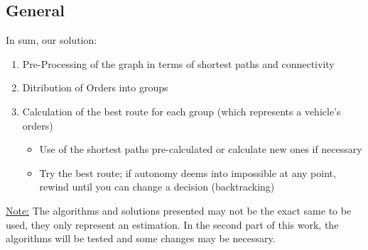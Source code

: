 \subsection{General}
In sum, our solution:
\begin{enumerate}
    \item Pre-Processing of the graph in terms of shortest paths and connectivity
    \item Ditribution of Orders into groups
    \item Calculation of the best route for each group (which represents a vehicle's orders)
    \begin{itemize}
        \item Use of the shortest paths pre-calculated or calculate new ones if necessary
        \item Try the best route; if autonomy deems into impossible at any point, rewind until you can change a decision (backtracking)
    \end{itemize}
\end{enumerate}
\uline{Note:} The algorithms and solutions presented may not be the exact same to be used, they only represent an estimation. In the second part of this work, the algorithms will be tested and some changes may be necessary.
